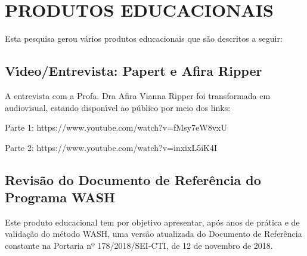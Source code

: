 \documentclass[
12pt,		%
openright,	%
twoside,  %
a4paper,			%
chapter=TITLE,		%
english,			%
french,				%
spanish,			%
brazil				%
]{USPSC-classe/USPSC}
\begin{document}
\chapter[PRODUTOS EDUCACIONAIS]{PRODUTOS EDUCACIONAIS}\label{PRODUTOS EDUCACIONAIS}
Esta pesquisa gerou v\'arios produtos educacionais que s\~ao descritos a seguir:

















\section[V\'{\i}deo/Entrevista: Papert e Afira Ripper]{V\'{\i}deo/Entrevista: Papert e Afira Ripper}\label{V\'{\i}deo/Entrevista: Papert e Afira Ripper}
A entrevista com a Profa. Dra Afira Vianna Ripper foi transformada em audiovisual, estando dispon\'{\i}vel ao p\'ublico por meio dos links:


















\begin{alineas}
\item Parte 1: https://www.youtube.com/watch?v=fMsy7eW8vxU
\item Parte 2: https://www.youtube.com/watch?v=inxixL5iK4I
\end{alineas}

\section[Revis\~ao do Documento de Refer\^encia do Programa WASH]{Revis\~ao do Documento de Refer\^encia do Programa WASH}\label{Revis\~ao do Documento de Refer\^encia do Programa WASH}
Este produto educacional tem por objetivo apresentar, ap\'os anos de pr\'atica e de valida\c{c}\~ao do m\'etodo WASH, uma vers\~ao atualizada do Documento de Refer\^encia constante na Portaria nº 178/2018/SEI-CTI, de 12 de novembro de 2018.
\end{document}
